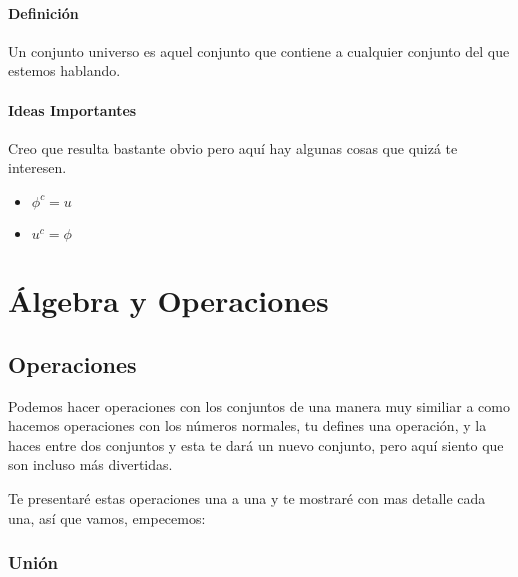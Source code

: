 \documentclass[12pt]{report}                                    %
\begin{document}
        \subsubsection*{Definición}
        Un conjunto universo es aquel conjunto que contiene a cualquier conjunto del que estemos hablando.


        \subsubsection*{Ideas Importantes}
        Creo que resulta bastante obvio pero aquí hay algunas cosas que quizá te interesen.
        \begin{itemize}
            \item $\phi^c = u$
            \item $u^c = \phi$
        \end{itemize}





\chapter{Álgebra y Operaciones}
    \clearpage

    \clearpage
    \section{Operaciones}

        Podemos hacer operaciones con los conjuntos de una manera muy similiar a como hacemos
        operaciones con los números normales, tu defines una operación, y la haces entre dos conjuntos
        y esta te dará un nuevo conjunto,  pero aquí siento que son incluso más divertidas.

        Te presentaré estas operaciones una a una y te mostraré con mas detalle cada una, así 
        que vamos, empecemos:
            
        \subsection{Unión}
\end{document}
